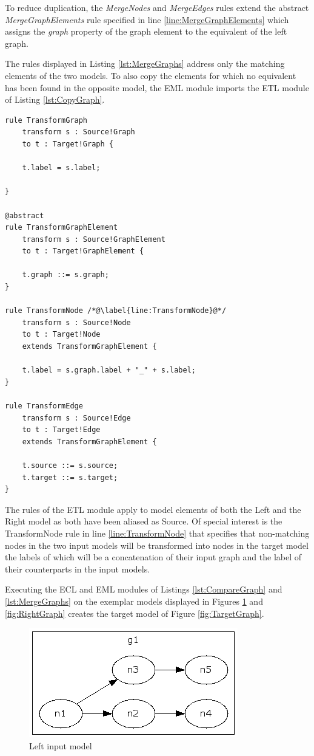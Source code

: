 To reduce duplication, the \emph{MergeNodes} and \emph{MergeEdges} rules extend the abstract \emph{MergeGraphElements} rule specified in line \ref{line:MergeGraphElements} which assigns the \emph{graph} property of the graph element to the equivalent of the left graph.

The rules displayed in Listing \ref{lst:MergeGraphs} address only the matching elements of the two models. To also copy the elements for which no equivalent has been found in the opposite model, the EML module imports the ETL module of Listing \ref{lst:CopyGraph}.

\begin{lstlisting}[caption=The Graphs.etl ETL transformation module, label=lst:CopyGraph, language=ETL]
rule TransformGraph 
	transform s : Source!Graph
	to t : Target!Graph {
	
	t.label = s.label;
	
}

@abstract
rule TransformGraphElement 
	transform s : Source!GraphElement
	to t : Target!GraphElement {
	
	t.graph ::= s.graph;
}

rule TransformNode /*@\label{line:TransformNode}@*/
	transform s : Source!Node
	to t : Target!Node 
	extends TransformGraphElement {
	
	t.label = s.graph.label + "_" + s.label;
}

rule TransformEdge 
	transform s : Source!Edge
	to t : Target!Edge 
	extends TransformGraphElement {
	
	t.source ::= s.source;
	t.target ::= s.target;	
} 
\end{lstlisting}

The rules of the ETL module apply to model elements of both the Left and the Right model as both have been aliased as Source. Of special interest is the TransformNode rule in line \ref{line:TransformNode} that specifies that non-matching nodes in the two input models will be transformed into nodes in the target model the labels of which will be a concatenation of their input graph and the label of their counterparts in the input models.

Executing the ECL and EML modules of Listings \ref{lst:CompareGraph} and \ref{lst:MergeGraphs} on the exemplar models displayed in Figures \ref{fig:LeftGraph} and \ref{fig:RightGraph} creates the target model of Figure \ref{fig:TargetGraph}.

\begin{figure}[h]
	\centering
		\includegraphics{images/LeftGraph.png}
	\caption{Left input model}
	\label{fig:LeftGraph}
\end{figure}


